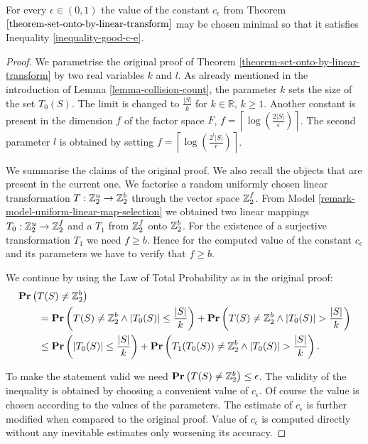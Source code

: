 \begin{statement}
\label{statement-good-c-e}
For every $\epsilon \in (0, 1)$ the value of the constant $c_\epsilon$ from Theorem $\ref{theorem-set-onto-by-linear-transform}$ may be chosen minimal so that it satisfies Inequality \ref{inequality-good-c-e}.
\end{statement}
\begin{proof}
We parametrise the original proof of Theorem \ref{theorem-set-onto-by-linear-transform} by two real variables $k$ and $l$. As already mentioned in the introduction of Lemma \ref{lemma-collision-count}, the parameter $k$ sets the size of the set $T_0(S)$. The limit is changed to $\frac{|S|}{k}$ for $k \in \mathbb{R}$, $k \geq 1$. Another constant is present in the dimension $f$ of the factor space $F$, $f = \left\lceil \log \left(\frac{2|S|}{\epsilon}\right) \right\rceil$. The second parameter $l$ is obtained by setting $f = \left\lceil \log \left( \frac{2 ^ l |S|}{\epsilon} \right) \right\rceil$.

We summarise the claims of the original proof. We also recall the objects that are present in the current one. We factorise a random uniformly chosen linear transformation $T: \mathbb{Z}_{2}^{u} \rightarrow \mathbb{Z}_{2}^{b}$ through the vector space $\mathbb{Z}_{2}^{f}$. From Model \ref{remark-model-uniform-linear-map-selection} we obtained two linear mappings $T_0: \mathbb{Z}_{2}^{u} \rightarrow \mathbb{Z}_{2}^{f}$ and a $T_1$ from $\mathbb{Z}_{2}^{f}$ onto $\mathbb{Z}_{2}^{b}$. For the existence of a surjective transformation $T_1$ we need $f \geq b$. Hence for the computed value of the constant $c_\epsilon$ and its parameters we have to verify that $f \geq b$.

We continue by using the Law of Total Probability as in the original proof:
\[
\begin{split}
& \mathbf{Pr}\left(T(S) \neq \mathbb{Z}_{2}^{b}\right) \\
    & \qquad = \mathbf{Pr}\left(T(S) \neq \mathbb{Z}_{2}^{b} \wedge |T_0(S)| \leq \frac{|S|}{k}\right) + \mathbf{Pr}\left(T(S) \neq \mathbb{Z}_{2}^{b} \wedge |T_0(S)| > \frac{|S|}{k}\right) \\ 
    & \qquad \leq \mathbf{Pr}\left(|T_0(S)| \leq \frac{|S|}{k}\right) + \mathbf{Pr}\left(T_1(T_0(S)) \neq \mathbb{Z}_{2}^{b} \wedge |T_0(S)| > \frac{|S|}{k}\right) \text{.}
\end{split}
\]

To make the statement valid we need $\mathbf{Pr}\left(T(S) \neq \mathbb{Z}_{2}^{b}\right) \leq \epsilon$. The validity of the inequality is obtained by choosing a convenient value of $c_{\epsilon}$. Of course the value is chosen according to the values of the parameters. The estimate of $c_{\epsilon}$ is further modified when compared to the original proof. Value of $c_{\epsilon}$ is computed directly without any inevitable estimates only worsening its accuracy.


\end{proof}

